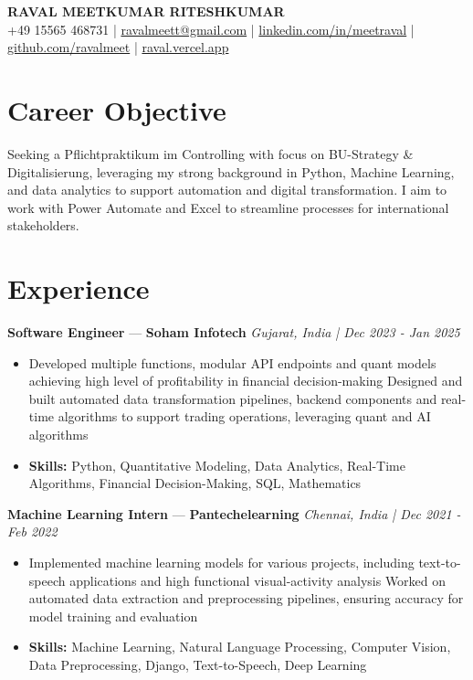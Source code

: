 \documentclass[a4paper,10pt]{article}
\begin{document}
\begin{center}
  {\Large\bfseries RAVAL MEETKUMAR RITESHKUMAR}\\[2pt]
  {\small +49 15565 468731 \;|\; \href{mailto:ravalmeett@gmail.com}{ravalmeett@gmail.com} \;|\; \href{https://www.linkedin.com/in/meetraval/}{linkedin.com/in/meetraval} \;|\; \href{https://github.com/ravalmeet}{github.com/ravalmeet} \;|\; \href{https://raval.vercel.app/}{raval.vercel.app}}
\end{center}
\vspace{-3pt}

\section*{Career Objective}
Seeking a Pflichtpraktikum im Controlling with focus on BU-Strategy \& Digitalisierung, leveraging my strong background in Python, Machine Learning, and data analytics to support automation and digital transformation. I aim to work with Power Automate and Excel to streamline processes for international stakeholders.\par

\section*{Experience}
\textbf{Software Engineer} — \textbf{Soham Infotech} \hfill \textit{Gujarat, India \;|\; Dec 2023 - Jan 2025}\par
\vspace{1pt}
\begin{itemize}
  \item Developed multiple functions, modular API endpoints and quant models achieving high level of profitability in financial decision-making Designed and built automated data transformation pipelines, backend components and real-time algorithms to support trading operations, leveraging quant and AI algorithms
  \item \textbf{Skills:} Python, Quantitative Modeling, Data Analytics, Real-Time Algorithms, Financial Decision-Making, SQL, Mathematics
\end{itemize}
\vspace{3pt}
\textbf{Machine Learning Intern} — \textbf{Pantechelearning} \hfill \textit{Chennai, India \;|\; Dec 2021 - Feb 2022}\par
\vspace{1pt}
\begin{itemize}
  \item Implemented machine learning models for various projects, including text-to-speech applications and high functional visual-activity analysis Worked on automated data extraction and preprocessing pipelines, ensuring accuracy for model training and evaluation
  \item \textbf{Skills:} Machine Learning, Natural Language Processing, Computer Vision, Data Preprocessing, Django, Text-to-Speech, Deep Learning
\end{itemize}
\end{document}
